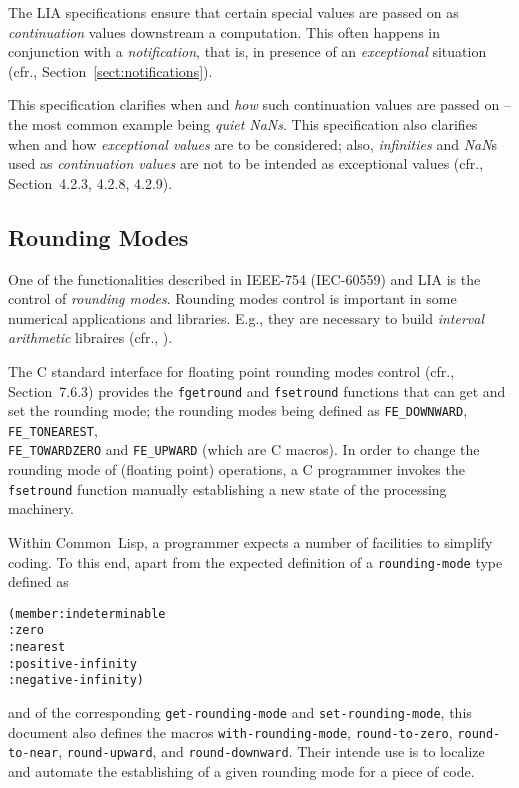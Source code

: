 \documentclass[10pt,fleqn]{article}
\newcommand{\CL}{\textsf{Common~Lisp}}
\newcommand{\CLang}{\textsf{C}}
\newcommand{\code}[1]{\texttt{#1}}
\newcommand{\clieeeterm}[1]{\textit{#1}}
\newcommand{\IEEEFPStd}{IEEE-754}
\newcommand{\IECFPStd}{IEC-60559}
\begin{document}
The LIA specifications ensure that certain special values are passed
on as \emph{continuation} values downstream a computation.  This often
happens in conjunction with a \emph{notification}, that is, in
presence of an \emph{exceptional} situation (cfr.,
Section~\ref{sect:notifications}).

This specification clarifies when and \emph{how} such continuation
values are passed on -- the most common example being
\clieeeterm{quiet NaNs}.  This specification also clarifies when and
how \emph{exceptional values} are to be considered; also,
\clieeeterm{infinities} and \clieeeterm{NaN}s used as
\emph{continuation values} are not to be intended as exceptional
values (cfr., \cite{2012:LIA1} Section~4.2.3, 4.2.8, 4.2.9).



\subsection{Rounding Modes}

One of the functionalities described in \IEEEFPStd{} (\IECFPStd{}) and LIA is
the control of \emph{rounding modes}.  Rounding modes control is
important in some numerical applications and libraries.  E.g., they
are necessary to build \emph{interval arithmetic} libraires (cfr., \cite{hickey:interval:2001,kulisch:complete:2009,revol:introIEEEIA:2017}).

The \CLang{} standard interface for floating point rounding modes
control (cfr., \cite{2018:C18} Section~7.6.3) provides the \code{fgetround}
and \code{fsetround} functions that can get and set the rounding mode;
the rounding modes being defined as \code{FE\_DOWNWARD},
\code{FE\_TONEAREST},\\
\code{FE\_TOWARDZERO} and \code {FE\_UPWARD} (which are \CLang{}
macros).  In order to change the rounding mode of (floating point)
operations, a \CLang{} programmer invokes the \code{fsetround}
function manually establishing a new state of the processing
machinery.

Within \CL{}, a programmer expects a number of facilities to simplify
coding.  To this end, apart from the expected definition of a
\code{rounding-mode} type defined as
\begin{alltt}
(member :indeterminable
        :zero
        :nearest
        :positive-infinity
        :negative-infinity)
\end{alltt}
and of the corresponding \code{get-rounding-mode} and
\code{set-rounding-mode}, this document also defines the macros
\code{with-rounding-mode}, \code{round-to-zero}, \code{round-to-near},
\code{round-upward}, and \code{round-downward}.  Their intende use is
to localize and automate the establishing of a given rounding mode for
a piece of code.
\end{document}
